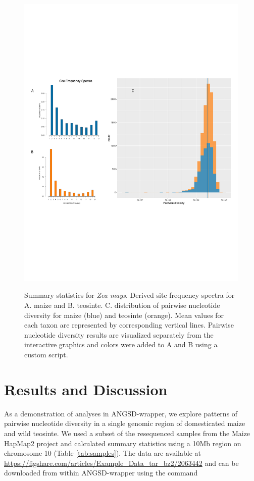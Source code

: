 \documentclass[10pt,a4paper]{article}
\begin{document}
\begin{figure}
\centering
\caption{Summary statistics for {\it Zea mays}. Derived site frequency spectra for A. maize and B. teosinte. C. distribution of pairwise nucleotide diversity for maize (blue) and teosinte (orange). Mean values for each taxon are represented by corresponding vertical lines. Pairwise nucleotide diversity results are visualized separately from the interactive graphics and colors were added to A and B using a custom script.}
\includegraphics[width=0.8\linewidth]{figures/figure3big.pdf}
\label{fig:figure3}
\end{figure}

\section*{Results and Discussion}
As a demonstration of analyses in ANGSD-wrapper, we explore patterns of pairwise nucleotide diversity in a single genomic region of domesticated maize and wild teosinte. 
We used a subset of the resequenced samples from the Maize HapMap2 project \citep{chia2012maize} and calculated summary statistics using a 10Mb region on chromosome 10 (Table \ref{tab:samples}). 
The data are available at \url{https://figshare.com/articles/Example_Data_tar_bz2/2063442} and can be downloaded from within ANGSD-wrapper using the command 
\end{document}

